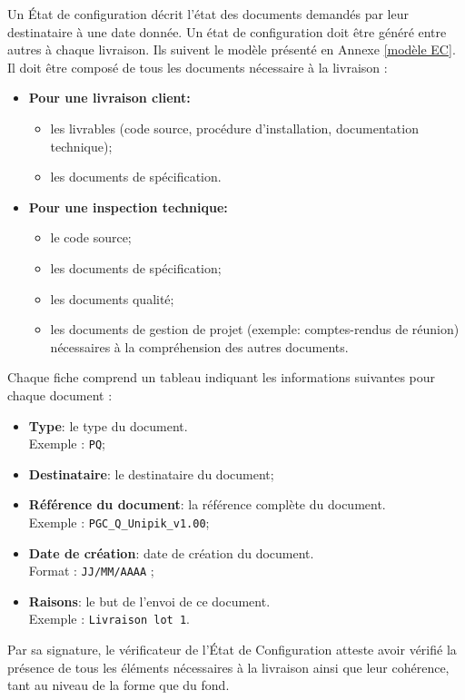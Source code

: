 Un État de configuration décrit l'état des documents demandés par leur destinataire à une date donnée. Un état de configuration doit être généré entre autres à chaque livraison. Ils suivent le modèle présenté en Annexe \ref{modèle EC}. Il doit être composé de tous les documents nécessaire à la livraison : 
\begin{itemize}
\item \textbf{Pour une livraison client:}
	\begin{itemize}
	\item les livrables (code source, procédure d'installation, documentation technique);
	\item les documents de spécification.
	\end{itemize}
\item \textbf{Pour une inspection technique:}
	\begin{itemize}
	\item le code source;
	\item les documents de spécification;
	\item les documents qualité;
	\item les documents de gestion de projet (exemple: comptes-rendus de réunion) nécessaires à la compréhension des autres documents.\\
	\end{itemize}
\end{itemize}


Chaque fiche comprend un tableau indiquant les informations suivantes pour chaque document :
\begin{itemize}
	\item \textbf{Type}: le type du document. \\
	Exemple : \verb+PQ+;
	\item \textbf{Destinataire}: le destinataire du document;
	\item \textbf{Référence du document}: la référence complète du document. \\
	Exemple : \verb+PGC_Q_Unipik_v1.00+;
	\item \textbf{Date de création}: date de création du document.\\
	Format : \verb+JJ/MM/AAAA+ ;
	\item \textbf{Raisons}: le but de l'envoi de ce document.\\
	Exemple : \verb+Livraison lot 1+.
\end{itemize}


\bigskip
Par sa signature, le vérificateur de l'État de Configuration atteste avoir vérifié la présence
de tous les éléments nécessaires à la livraison ainsi que leur cohérence, tant au niveau de
la forme que du fond.

